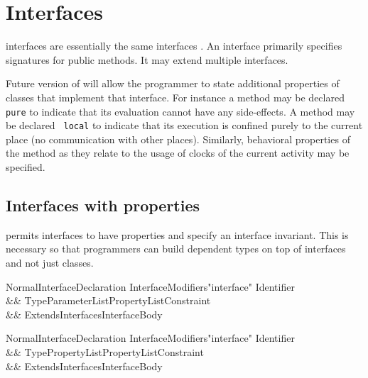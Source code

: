 \chapter{Interfaces}
\label{XtenInterfaces}

{}\XtenCurrVer{} interfaces are essentially the same \java{}
interfaces \cite[\S 9]{jls2}. An interface primarily specifies
signatures for public methods. It may extend multiple interfaces. 


Future version of \Xten{} will allow the programmer to state
additional properties of classes that implement that interface. For
instance a method may be declared {\tt pure} to indicate that its
evaluation cannot have any side-effects. A method may be declared {\tt
local} to indicate that its execution is confined purely to the
current place (no communication with other places). Similarly,
behavioral properties of the method as they relate to the usage of
clocks of the current activity may be specified.

\section{Interfaces with properties}\label{DepType:Interface}

\Xten{} permits interfaces to have properties and specify an interface
invariant. This is necessary so that programmers can build dependent
types on top of interfaces and not just classes.

\iftypeparams

\begin{grammar}
NormalInterfaceDeclaration \:
      InterfaceModifiers\opt \xcd"interface" Identifier  \\
   && TypeParameterList\opt PropertyList\opt Constraint\opt \\
   && ExtendsInterfaces\opt InterfaceBody \\
\end{grammar}

\else

\begin{grammar}
NormalInterfaceDeclaration \:
      InterfaceModifiers\opt \xcd"interface" Identifier  \\
   && TypePropertyList\opt PropertyList\opt Constraint\opt \\
   && ExtendsInterfaces\opt InterfaceBody \\
\end{grammar}

